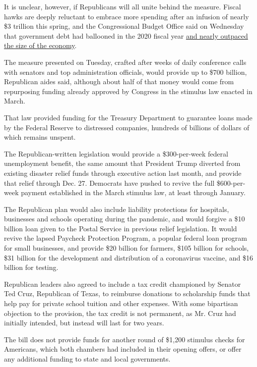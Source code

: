 It is unclear, however, if Republicans will all unite behind the
measure. Fiscal hawks are deeply reluctant to embrace more spending
after an infusion of nearly \$3 trillion this spring, and the
Congressional Budget Office said on Wednesday that government debt had
ballooned in the 2020 fiscal year
\href{https://www.nytimes3xbfgragh.onion/2020/09/02/business/us-federal-debt.html}{and
nearly outpaced the size of the economy}.

The measure presented on Tuesday, crafted after weeks of daily
conference calls with senators and top administration officials, would
provide up to \$700 billion, Republican aides said, although about half
of that money would come from repurposing funding already approved by
Congress in the stimulus law enacted in March.

That law provided funding for the Treasury Department to guarantee loans
made by the Federal Reserve to distressed companies, hundreds of
billions of dollars of which remains unspent.

The Republican-written legislation would provide a \$300-per-week
federal unemployment benefit, the same amount that President Trump
diverted from existing disaster relief funds through executive action
last month, and provide that relief through Dec. 27. Democrats have
pushed to revive the full \$600-per-week payment established in the
March stimulus law, at least through January.

The Republican plan would also include liability protections for
hospitals, businesses and schools operating during the pandemic, and
would forgive a \$10 billion loan given to the Postal Service in
previous relief legislation. It would revive the lapsed Paycheck
Protection Program, a popular federal loan program for small businesses,
and provide \$20 billion for farmers, \$105 billion for schools, \$31
billion for the development and distribution of a coronavirus vaccine,
and \$16 billion for testing.

Republican leaders also agreed to include a tax credit championed by
Senator Ted Cruz, Republican of Texas, to reimburse donations to
scholarship funds that help pay for private school tuition and other
expenses. With some bipartisan objection to the provision, the tax
credit is not permanent, as Mr. Cruz had initially intended, but instead
will last for two years.

The bill does not provide funds for another round of \$1,200 stimulus
checks for Americans, which both chambers had included in their opening
offers, or offer any additional funding to state and local governments.

